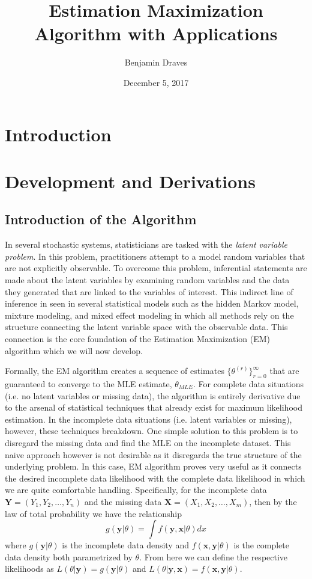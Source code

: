 \documentclass{article}
\title{Estimation Maximization Algorithm with Applications}
\author{
  Benjamin Draves
}
\date{December 5, 2017}
\begin{document}
\maketitle

\begin{abstract}

\end{abstract}

\section{Introduction}

\section{Development and Derivations}

\subsection{Introduction of the Algorithm}
In several stochastic systems, statisticians are tasked with the \textit{latent variable problem}. In this problem, practitioners attempt to a model random variables that are not explicitly observable. To overcome this problem, inferential statements are made about the latent variables by examining random variables and the data they generated that are linked to the variables of interest. This indirect line of inference in seen in several statistical models such as the hidden Markov model, mixture modeling, and mixed effect modeling in which all methods rely on the structure connecting the latent variable space with the observable data. This connection is the core foundation of the Estimation Maximization (EM) algorithm which we will now develop. 

Formally, the EM algorithm creates a sequence of estimates $\{\theta^{(r)}\}_{r=0}^{\infty}$ that are guaranteed to converge to the MLE estimate, $\theta_{MLE}$. For complete data situations (i.e. no latent variables or missing data), the algorithm is entirely derivative due to the arsenal of statistical techniques that already exist for maximum likelihood estimation. In the incomplete data situations (i.e. latent variables or missing), however, these techniques breakdown. One simple solution to this problem is to disregard the missing data and find the MLE on the incomplete dataset. This naive approach however is not desirable as it disregards the true structure of the underlying problem. In this case, EM algorithm proves very useful as it connects the desired incomplete data likelihood with the complete data likelihood in which we are quite comfortable handling. Specifically, for the incomplete data $\mathbf{Y} = (Y_1, Y_2, \ldots, Y_n)$ and the missing data $\mathbf{X} = (X_1, X_2, \ldots, X_m)$, then by the law of total probability we have the relationship $$g(\mathbf{y}|\theta) = \int f(\mathbf{y}, \mathbf{x}|\theta)dx$$ where $g(\mathbf{y}|\theta)$ is the incomplete data density and $f(\mathbf{x},\mathbf{y}|\theta)$ is the complete data density both parametrized by $\theta$. From here we can define the respective likelihoods as $L(\theta|\mathbf{y}) = g(\mathbf{y}|\theta)$ and $L(\theta|\mathbf{y}, \mathbf{x}) = f(\mathbf{x},\mathbf{y}|\theta)$. 
\end{document}
